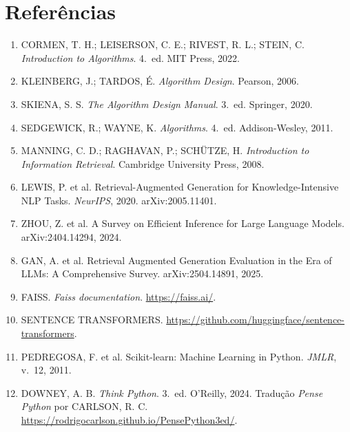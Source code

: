 \documentclass[11pt,a4paper]{article}
\begin{document}
\section{Referências}
\begin{enumerate}[leftmargin=1.6em,itemsep=1pt]\small
\item CORMEN, T. H.; LEISERSON, C. E.; RIVEST, R. L.; STEIN, C. \emph{Introduction to Algorithms}. 4.~ed. MIT Press, 2022.
\item KLEINBERG, J.; TARDOS, É. \emph{Algorithm Design}. Pearson, 2006.
\item SKIENA, S. S. \emph{The Algorithm Design Manual}. 3.~ed. Springer, 2020.
\item SEDGEWICK, R.; WAYNE, K. \emph{Algorithms}. 4.~ed. Addison-Wesley, 2011.
\item MANNING, C. D.; RAGHAVAN, P.; SCHÜTZE, H. \emph{Introduction to Information Retrieval}. Cambridge University Press, 2008.
\item LEWIS, P. et al. Retrieval-Augmented Generation for Knowledge-Intensive NLP Tasks. \emph{NeurIPS}, 2020. arXiv:2005.11401.
\item ZHOU, Z. et al. A Survey on Efficient Inference for Large Language Models. arXiv:2404.14294, 2024.
\item GAN, A. et al. Retrieval Augmented Generation Evaluation in the Era of LLMs: A Comprehensive Survey. arXiv:2504.14891, 2025.
\item FAISS. \emph{Faiss documentation}. \url{https://faiss.ai/}.
\item SENTENCE TRANSFORMERS. \url{https://github.com/huggingface/sentence-transformers}.
\item PEDREGOSA, F. et al. Scikit-learn: Machine Learning in Python. \emph{JMLR}, v.~12, 2011.
\item DOWNEY, A. B. \emph{Think Python}. 3.~ed. O'Reilly, 2024. Tradução \emph{Pense Python} por CARLSON, R. C. \url{https://rodrigocarlson.github.io/PensePython3ed/}.
\end{enumerate}
\end{document}
